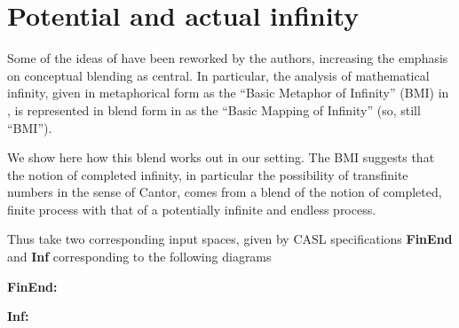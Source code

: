 \section{Potential and actual infinity}


Some of the ideas of \textcite{Lak00} have been reworked by the
authors, increasing the emphasis on conceptual blending as central.
In particular, the analysis of mathematical infinity, given in
metaphorical form as the ``Basic Metaphor of Infinity'' (BMI) in
\textcite{Lak00}, is represented in blend form in \textcite{nunez05}
as the ``Basic Mapping of Infinity'' (so, still ``BMI'').

We show here how this blend works out in our setting.
The BMI suggests that the notion of completed infinity,
in particular the possibility of transfinite numbers in the sense
of Cantor, comes from a blend of the notion of completed,
finite process with that of a potentially infinite and endless
process.

Thus take two corresponding input spaces, given by CASL specifications
\textbf{FinEnd} and \textbf{Inf} corresponding to the following diagrams


  \noindent
  \textbf{FinEnd:}
\begin{center}
\end{center}
\noindent\textbf{Inf:} 
\begin{center}
\end{center}


